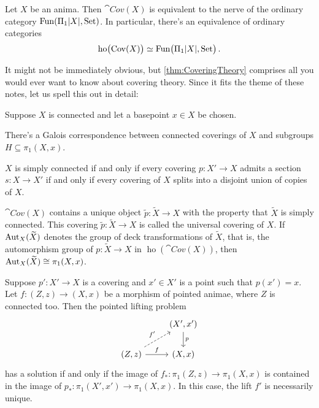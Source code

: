 \begin{thm}\label{thm:CoveringTheory}
	Let $X$ be an anima. Then $\cat{Cov}(X)$ is equivalent to the nerve of the ordinary category $\Fun(\Pi_1\abs{X},\cat{Set})$. In particular, there's an equivalence of ordinary categories
	\begin{equation*}
		\operatorname{ho}\bigl(\cat{Cov}(X)\bigr)\simeq \Fun\bigl(\Pi_1\abs{X},\cat{Set}\bigr)\,.
	\end{equation*}
\end{thm}
It might not be immediately obvious, but \cref{thm:CoveringTheory} comprises all you would ever want to know about covering theory. Since it fits the theme of these notes, let us spell this out in detail:

\begin{cor}\label{cor:CoveringTheory}
	Suppose $X$ is connected and let a basepoint $x\in X$ be chosen.
	\begin{alphanumerate}
		\item There's a Galois correspondence  between connected coverings of $X$ and subgroups $H\subseteq \pi_1(X,x)$.\label{enum:GaloisCorrespondence}
		\item $X$ is simply connected  if and only if every covering $p\colon X'\rightarrow X$ admits a section $s\colon X\rightarrow X'$ if and only if every covering of $X$ splits into a disjoint union of copies of $X$.\label{enum:SplitCovering}
		\item $\cat{Cov}(X)$ contains a unique object $\widetilde{p}\colon \widetilde{X}\rightarrow X$  with the property that $\widetilde{X}$ is simply connected. This covering $\widetilde{p}\colon \widetilde{X}\rightarrow X$ is called the universal covering of $X$. If $\operatorname{Aut}_X(\widetilde{X})$ denotes the group of deck transformations of $\widetilde{X}$, that is, the automorphism group of $p\colon \widetilde{X}\rightarrow X$ in $\operatorname{ho}(\cat{Cov}(X))$, then $\operatorname{Aut}_X(\widetilde{X})\cong \pi_1(X,x)$.\label{enum:UniversalCovering}
		\item Suppose $p'\colon X'\rightarrow X$ is a covering and $x'\in X'$ is a point such that $p(x')=x$. Let $f\colon (Z,z)\rightarrow (X,x)$ be a morphism of pointed animae, where $Z$ is connected too. Then the pointed lifting problem\label{enum:LiftingPropertyOfCoverings}
		\begin{equation*}
			\begin{tikzcd}
				& (X',x')\dar["p"]\\
				(Z,z)\urar[dashed,"f'"]\rar["f"] & (X,x)
			\end{tikzcd}
		\end{equation*}
		has a solution if and only if the image of $f_*\colon \pi_1(Z,z)\rightarrow \pi_1(X,x)$ is contained in the image of $p_*\colon \pi_1(X',x')\rightarrow \pi_1(X,x)$. In this case, the lift $f'$ is necessarily unique.
	\end{alphanumerate}
\end{cor}
